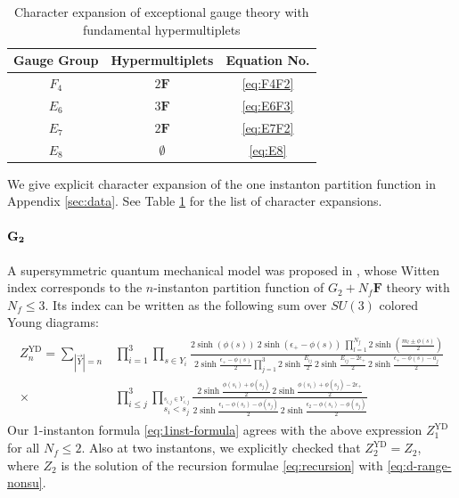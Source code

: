 \documentclass[letterpaper, 11pt]{article}
\def\e{\epsilon}
\begin{document}
{\begin{table}[h!]
\centering
  \begin{tabular}{cc|c}
    \hline
    Gauge Group & Hypermultiplets & Equation No.\\
    \hline\hline
	$F_4$ & $2\boldsymbol{F}$ & \eqref{eq:F4F2}\\
	$E_6$ & $3\boldsymbol{F}$ & \eqref{eq:E6F3}\\
	$E_7$ & $2\boldsymbol{F}$ & \eqref{eq:E7F2}\\
	$E_8$ & $\emptyset$ &  \eqref{eq:E8}\\\hline
    \end{tabular}
  \caption{Character expansion of exceptional gauge theory with fundamental hypermultiplets}
  \label{tbl:exc-data}
\end{table}

We give explicit character expansion of the one instanton partition function in Appendix \ref{sec:data}. See Table \ref{tbl:exc-data} for the list of character expansions. 

\paragraph{$\bf G_2$}
A supersymmetric quantum mechanical model was proposed in  \cite{Kim:2018gjo}, whose Witten index corresponds to the $n$-instanton partition function of 
$G_2 + N_f \mathbf{F}$ theory with $N_f \leq 3$. Its index can be written as the following sum over $SU(3)$ colored Young diagrams:
\begin{align}
\begin{split}
  Z_n^\text{YD} = \sum_{|\vec{Y}| = n} &\prod_{i=1}^3\prod_{s \in Y_i}\frac{2\sinh{(\phi(s))} \ 2\sinh{(\e_+-\phi(s))} \ \prod_{l=1}^{N_f}2\sinh(\frac{m_l \pm \phi(s)}{2}) }{2\sinh{\frac{\e_+ - \phi(s)}{2}}\prod_{j=1}^3 2\sinh{\frac{E_{ij}}{2}}\,2\sinh{\frac{E_{ij}-2\e_+}{2}}\,2\sinh{\frac{\e_+ - \phi(s) - a_j}{2}}} \\ \times &\prod_{i \leq j}^3 \prod_{\stackrel{s_{i,j} \in Y_{i,j}}{s_i < s_j}} \frac{2\sinh{\frac{\phi(s_i)+\phi(s_j)}{2}}\, 2\sinh{\frac{\phi(s_i)+\phi(s_j)-2\e_+}{2}}}{ 2\sinh{\frac{\e_1 - \phi(s_i)-\phi(s_j)}{2}} \, 2\sinh{\frac{\e_2 - \phi(s_i)-\phi(s_j)}{2}}}
\end{split}
\end{align}
Our 1-instanton formula \eqref{eq:1inst-formula} agrees with the above expression $Z_1^\text{YD}$ for all $N_f \leq 2$. Also at two instantons, we explicitly checked that $Z_2^\text{YD} = Z_2$, where $Z_2$ is the solution of the recursion formulae \eqref{eq:recursion} with \eqref{eq:d-range-nonsu}.


}
\end{document}
